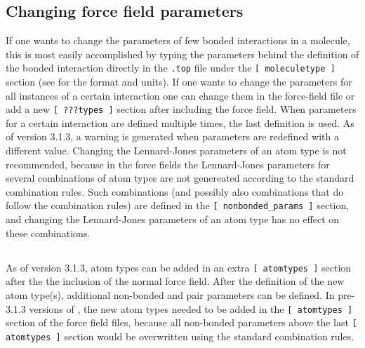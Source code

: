 \subsection{Changing force field parameters
}
If one wants to change the parameters of few bonded interactions in
a molecule, this is most easily accomplished by typing the parameters
behind the definition of the bonded interaction directly in the {\tt *.top} file 
under the {\tt [ moleculetype ]} section (see  for the format
and units).
If one wants to change the parameters for all instances of a certain
interaction one can change them in the force-field file or add a
new {\tt [ ???types ]} section after including the force field.
When parameters for a certain interaction are defined multiple times,
the last definition is used. As of {\gromacs} version 3.1.3, a warning is
generated when parameters are redefined with a different value.
Changing the Lennard-Jones parameters of an atom type is not
recommended, because in the {\gromos} force fields
the Lennard-Jones parameters for several combinations of atom types
are not genereated according to the standard combination rules.
Such combinations (and possibly also combinations that do follow the
combination rules) are defined in the {\tt [ nonbonded\_params ]}
section, and changing the Lennard-Jones parameters of an atom type
has no effect on these combinations.

\subsection{}
As of {\gromacs} version 3.1.3, atom types can be added in an extra
{\tt [ atomtypes ]} section after the the inclusion of the normal
force field. After the definition of the new atom type(s), additional
non-bonded and pair parameters can be defined.
In pre-3.1.3 versions of {\gromacs}, the new atom types needed to be
added in the {\tt [ atomtypes ]} section of the force field files,
because all non-bonded parameters above the last {\tt [ atomtypes ]}
section would be overwritten using the standard combination rules.

